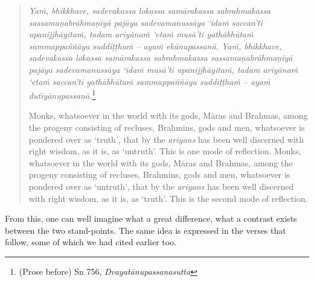 \begin{quote}
\emph{Yaṁ, bhikkhave, sadevakassa lokassa samārakassa sabrahmakassa sassamaṇabrāhmaṇiyā pajāya sadevamanussāya `idaṁ saccan'ti upanijjhāyitaṁ, tadam ariyānaṁ `etaṁ musā'ti yathābhūtaṁ sammappaññāya suddiṭṭhaṁ -- ayaṁ ekānupassanā. Yaṁ, bhikkhave, sadevakassa lokassa samārakassa sabrahmakassa sassamaṇabrāhmaṇiyā pajāya sadevamanussāya `idaṁ musā'ti upanijjhāyitaṁ, tadam ariyānaṁ `etaṁ saccan'ti yathābhūtaṁ sammappaññāya suddiṭṭhaṁ -- ayaṁ dutiyānupassanā.}\footnote{(Prose before) Sn 756, \emph{Dvayatānupassanasutta}}

Monks, whatsoever in the world with its gods, Māras and Brahmas, among the progeny consisting of recluses, Brahmins, gods and men, whatsoever is pondered over as `truth', that by the \emph{ariyans} has been well discerned with right wisdom, as it is, as `untruth'. This is one mode of reflection. Monks, whatsoever in the world with its gods, Māras and Brahmas, among the progeny consisting of recluses, Brahmins, gods and men, whatsoever is pondered over as `untruth', that by the \emph{ariyans} has been well discerned with right wisdom, as it is, as `truth'. This is the second mode of reflection.
\end{quote}

From this, one can well imagine what a great difference, what a contrast exists between the two stand-points. The same idea is expressed in the verses that follow, some of which we had cited earlier too.

